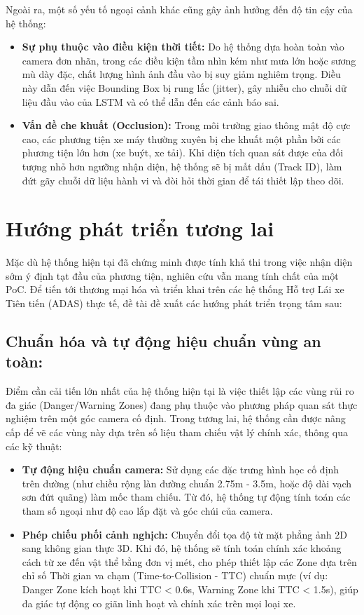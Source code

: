 	Ngoài ra, một số yếu tố ngoại cảnh khác cũng gây ảnh hưởng đến độ tin cậy của hệ thống:
	\begin{itemize}
    	\item \textbf{Sự phụ thuộc vào điều kiện thời tiết:} Do hệ thống dựa hoàn toàn vào camera đơn nhãn, trong các điều kiện tầm nhìn kém như mưa lớn hoặc sương mù dày đặc, chất lượng hình ảnh đầu vào bị suy giảm nghiêm trọng. Điều này dẫn đến việc Bounding Box bị rung lắc (jitter), gây nhiễu cho chuỗi dữ liệu đầu vào của LSTM và có thể dẫn đến các cảnh báo sai.
    	\item \textbf{Vấn đề che khuất (Occlusion):} Trong môi trường giao thông mật độ cực cao, các phương tiện xe máy thường xuyên bị che khuất một phần bởi các phương tiện lớn hơn (xe buýt, xe tải). Khi diện tích quan sát được của đối tượng nhỏ hơn ngưỡng nhận diện, hệ thống sẽ bị mất dấu (Track ID), làm đứt gãy chuỗi dữ liệu hành vi và đòi hỏi thời gian để tái thiết lập theo dõi.
	\end{itemize}

	\section{Hướng phát triển tương lai}
	Mặc dù hệ thống hiện tại đã chứng minh được tính khả thi trong việc nhận diện sớm ý định tạt đầu của phương tiện, nghiên cứu vẫn mang tính chất của một PoC. Để tiến tới thương mại hóa và triển khai trên các hệ thống Hỗ trợ Lái xe Tiên tiến (ADAS) thực tế, đề tài đề xuất các hướng phát triển trọng tâm sau:
	
	\subsection{Chuẩn hóa và tự động hiệu chuẩn vùng an toàn:}
	Điểm cần cải tiến lớn nhất của hệ thống hiện tại là việc thiết lập các vùng rủi ro đa giác (Danger/Warning Zones) đang phụ thuộc vào phương pháp quan sát thực nghiệm trên một góc camera cố định. Trong tương lai, hệ thống cần được nâng cấp để vẽ các vùng này dựa trên số liệu tham chiếu vật lý chính xác, thông qua các kỹ thuật:
	\begin{itemize}
		\item \textbf{Tự động hiệu chuẩn camera:} Sử dụng các đặc trưng hình học cố định trên đường (như chiều rộng làn đường chuẩn 2.75m - 3.5m, hoặc độ dài vạch sơn đứt quãng) làm mốc tham chiếu. Từ đó, hệ thống tự động tính toán các tham số ngoại như độ cao lắp đặt và góc chúi của camera.
		\item \textbf{Phép chiếu phối cảnh nghịch:} Chuyển đổi tọa độ từ mặt phẳng ảnh 2D sang không gian thực 3D. Khi đó, hệ thống sẽ tính toán chính xác khoảng cách từ xe đến vật thể bằng đơn vị mét, cho phép thiết lập các Zone dựa trên chỉ số Thời gian va chạm (Time-to-Collision - TTC) chuẩn mực (ví dụ: Danger Zone kích hoạt khi TTC < 0.6s, Warning Zone khi TTC < 1.5s), giúp đa giác tự động co giãn linh hoạt và chính xác trên mọi loại xe.
	\end{itemize}
	
